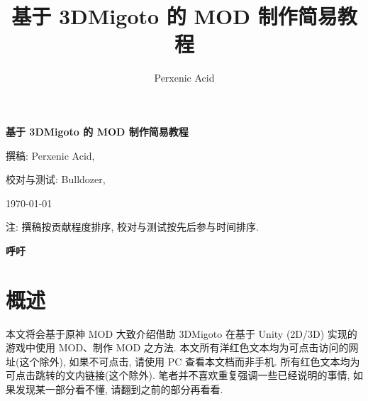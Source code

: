 \documentclass{article}
\title{基于 3DMigoto 的 MOD 制作简易教程}
\author{Perxenic Acid}
\begin{document}
    \begin{titlepage}
        \centering
        \vspace*{2cm}

        {\huge \bfseries 基于 3DMigoto 的 MOD 制作简易教程 \par}
        \vspace{1.5cm}
        {\Large 撰稿: {\Brachetto Perxenic Acid}, \par}
        \vspace{0.5cm}
        {\large 校对与测试: Bulldozer, \par}
        \vspace{1cm}
        {\large \today \par}

        
        \vfill
        {\footnotesize 注: 撰稿按贡献程度排序, 校对与测试按先后参与时间排序.}
    \end{titlepage}
    \tableofcontents
    \clearpage
    \vspace*{0pt}\vfill
        \begin{center}
            {\Huge{\textbf{\color{red!90!black}呼吁}}}
        \end{center}
            \vfill\clearpage
        \section*{概述}
            \par 本文将会基于原神 MOD 大致介绍借助 3DMigoto 在基于 Unity (2D/3D) 实现的游戏中使用 MOD、制作 MOD 之方法. 本文所有{\color{magenta}洋红色文本}均为可点击访问的网址(这个除外), 如果不可点击, 请使用 PC 查看本文档而非手机. 所有{\color{red}红色文本}均为可点击跳转的文内链接(这个除外). 笔者并不喜欢重复强调一些已经说明的事情, 如果发现某一部分看不懂, 请翻到之前的部分再看看.
    
    
    
\end{document}
